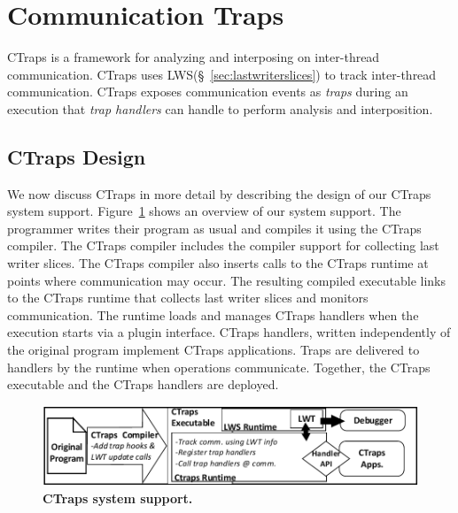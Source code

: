 \documentclass[pageno,nohyperref]{jpaper}
\newcommand{\ctraps}{CTraps\xspace}
\newcommand{\lws}{LWS\xspace}
\newcommand{\Caption}[1]{\begin{minipage}{.95\columnwidth} \caption{#1} \end{minipage} \vspace{-1.2ex}}
\begin{document}
\section{Communication Traps}
\label{sec:ctraps}

\ctraps is a framework for analyzing and interposing on inter-thread
communication.  \ctraps uses \lws (\S~\ref{sec:lastwriterslices}) to track
inter-thread communication.  \ctraps exposes communication events as {\em
traps} during an execution that {\em trap handlers} can handle to perform
analysis and interposition.  

\subsection{\ctraps Design}

We now discuss \ctraps in more detail by describing the design of our \ctraps
system support.  Figure~\ref{fig:systemdiagram} shows an overview of our system
support.  The programmer writes their program as usual and compiles it using
the \ctraps compiler. The \ctraps compiler includes the compiler support for
collecting last writer slices.  The \ctraps compiler also inserts
calls to the \ctraps runtime at points where communication may occur.  The
resulting compiled executable links to the \ctraps runtime that collects last
writer slices and monitors communication.  The runtime loads and manages \ctraps
handlers when the execution starts via a plugin interface.  \ctraps handlers,
written independently of the original program implement \ctraps applications.
Traps are delivered to handlers by the runtime when operations communicate.
Together, the \ctraps executable and the \ctraps handlers are deployed.


\begin{figure}[htb]
\centering
\includegraphics[width=.90\columnwidth]{figs/CTraps_Overview.pdf}
\Caption{\label{fig:systemdiagram}{\bf CTraps system support.}}
\end{figure}


\end{document}
